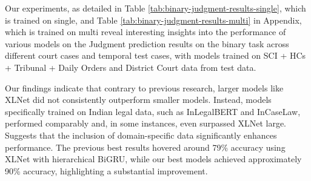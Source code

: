 
\begin{table}[ht]
\centering
{}
\caption{Judgment prediction results on the ternary task on SCI court cases. The best results are in bold.}
\label{tab:judgment-prediction-ternary}
\end{table}
Our experiments, as detailed in Table \ref{tab:binary-judgment-results-single}, which is trained on \texttt{\named} single, and Table \ref{tab:binary-judgment-results-multi} in Appendix, which is trained on \texttt{\named} multi reveal interesting insights into the performance of various models on the Judgment prediction results on the binary task across different court cases and temporal test cases, with models trained on SCI + HCs + Tribunal + Daily Orders and District Court data from \texttt{\named} test data. 

Our findings indicate that contrary to previous research, larger models like XLNet did not consistently outperform smaller models. Instead, models specifically trained on Indian legal data, such as InLegalBERT and InCaseLaw, performed comparably and, in some instances, even surpassed XLNet large. Suggests that the inclusion of domain-specific data significantly enhances performance. The previous best results hovered around 79\% accuracy using XLNet with hierarchical BiGRU, while our best models achieved approximately 90\% accuracy, highlighting a substantial improvement.

